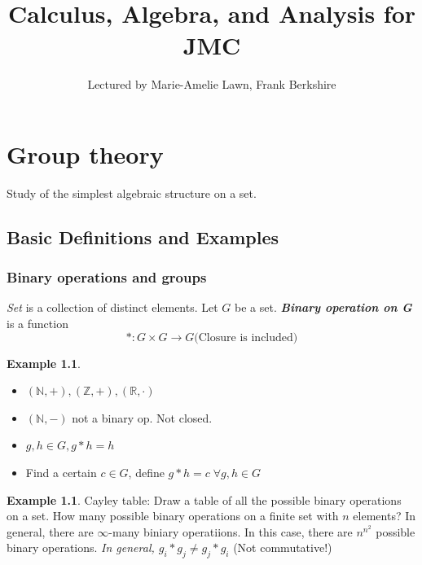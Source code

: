 \documentclass[12pt]{report}
\author{Lectured by Marie-Amelie Lawn, Frank Berkshire}
\title{Calculus, Algebra, and Analysis for JMC}
\affil{Typed by Aris Zhu Yi Qing}
\theoremstyle{definition}
\begin{document}
\maketitle
\tableofcontents

\chapter{Group theory}

Study of the simplest algebraic structure on a set.

\section{Basic Definitions and Examples}

\subsection{Binary operations and groups}

\begin{theorem}
    \emph{Set} is a collection of distinct elements. Let $G$ be a set.
    \textbf{\emph{Binary operation on G}} is a function\[
        *: G \times G \rightarrow G \text{(Closure is included)}
    \]
\end{theorem}

\newtheorem{ex}[theorem]{Example}
\begin{ex}
    \;
    
    \begin{itemize}
        \item $(\mathbb{N}, +), (\mathbb{Z}, +), (\mathbb{R}, \cdot)$
        \item $(\mathbb{N}, -)$ not a binary op. Not closed.
        \item $g, h \in G, g * h = h$
        \item Find a certain $c \in G$, define $g*h = c \;\forall g, h \in G$
    \end{itemize}
    
\end{ex}

\begin{ex}
    Cayley table: Draw a table of all the possible binary operations on a set.
    How many possible binary operations on a finite set with $n$ elements?
    In general, there are $\infty$-many biniary operatiions. In this case, there are $n^{n^2}$ possible binary operations.
    \emph{In general, $g_i * g_j \neq g_j * g_i$} (Not commutative!)
    
\end{ex}
\end{document}
